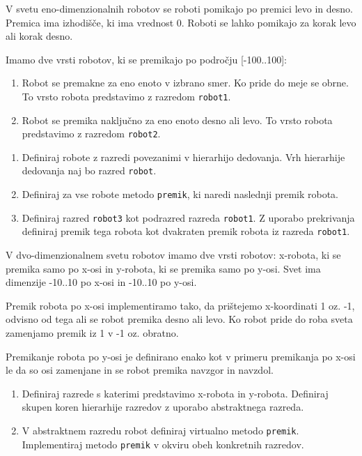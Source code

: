 \begin{ex}
  V svetu eno-dimenzionalnih robotov se roboti pomikajo po premici
  levo in desno. Premica ima izhodi\v s\v ce, ki ima vrednost
  0. Roboti se lahko pomikajo za korak levo ali korak desno. 

  Imamo dve vrsti robotov, ki se premikajo po podro\v cju [-100..100]:

  \begin{enumerate}
  \item Robot se premakne za eno enoto v izbrano smer. Ko pride do
    meje se obrne. To vrsto robota predstavimo z razredom
    \lstinline{robot1}.

  \item Robot se premika naklju\v cno za eno enoto desno ali levo. To
    vrsto robota predstavimo z razredom \lstinline{robot2}.
  \end{enumerate}

  \begin{enumerate}[label=(\roman*)]
  \item Definiraj robote z razredi povezanimi v hierarhijo
    dedovanja. Vrh hierarhije dedovanja naj bo razred \lstinline{robot}.

  \item Definiraj za vse robote metodo \lstinline{premik}, ki naredi
    naslednji premik robota.

  \item Definiraj razred \lstinline{robot3} kot podrazred razreda
    \lstinline{robot1}. Z uporabo prekrivanja definiraj premik tega
    robota kot dvakraten premik robota iz razreda \lstinline{robot1}.
  \end{enumerate}


\end{ex} 
\begin{ex}
  V dvo-dimenzionalnem svetu robotov imamo dve vrsti robotov:
  x-robota, ki se premika samo po x-osi in y-robota, ki se premika
  samo po y-osi. Svet ima dimenzije -10..10 po x-osi in -10..10 po
  y-osi.

  Premik robota po x-osi implementiramo tako, da pri\v stejemo
  x-koordinati 1 oz. -1, odvisno od tega ali se robot premika desno
  ali levo. Ko robot pride do roba sveta zamenjamo premik iz 1 v -1
  oz. obratno.

  Premikanje robota po y-osi je definirano enako kot v primeru
  premikanja po x-osi le da so osi zamenjane in se robot premika
  navzgor in navzdol.

  \begin{enumerate}
  \item Definiraj razrede s katerimi predstavimo x-robota in
    y-robota. Definiraj skupen koren hierarhije razredov z uporabo
    abstraktnega razreda.

  \item V abstraktnem razredu robot definiraj virtualno metodo
    \lstinline{premik}. Implementiraj metodo \lstinline{premik} v
    okviru obeh konkretnih razredov.
  \end{enumerate}


\end{ex} 
